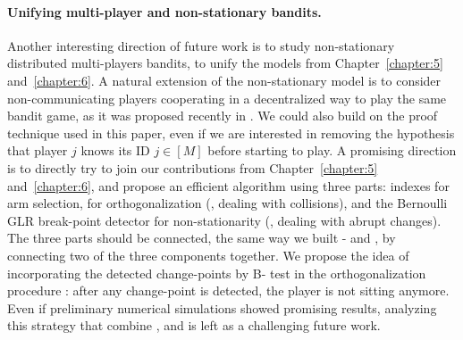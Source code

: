 \paragraph{Unifying multi-player and non-stationary bandits.}
%
%
Another interesting direction of future work is to study non-stationary distributed multi-players bandits, to unify the models from Chapter~\ref{chapter:5} and~\ref{chapter:6}.
A natural extension of the non-stationary model is to consider non-communicating players cooperating in a decentralized way to play the same bandit game, as it was proposed recently in \cite{WeiSrivastava18Distributed}.
%
We could also build on the proof technique used in this paper, even if we are interested in removing the hypothesis that player $j$ knows its ID $j\in[M]$ before starting to play.
%
A promising direction is to directly try to join our contributions from Chapter~\ref{chapter:5} and~\ref{chapter:6}, and propose an efficient algorithm using three parts:
\klUCB{} indexes for arm selection,
\MCTopM{} for orthogonalization (\ie, dealing with collisions),
and the Bernoulli GLR break-point detector for non-stationarity (\ie, dealing with abrupt changes).
The three parts should be connected, the same way we built \MCTopM-\klUCB{} and \GLRklUCB, by connecting two of the three components together.
We propose the idea of incorporating the detected change-points by B-\GLR{} test in the orthogonalization procedure \MCTopM: after any change-point is detected, the player is not sitting anymore.
%
Even if preliminary numerical simulations showed promising results,
analyzing this strategy that combine \MCTopM, \GLR{} and \klUCB{} is left as a challenging future work.



